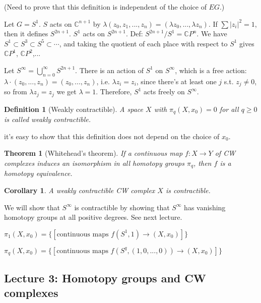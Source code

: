 \documentclass{article}
\theoremstyle{mystyle}
\newtheorem*{definition}{Definition}%
\newtheorem*{theorem*}{Theorem}
\newtheorem*{corollary*}{Corollary}
\theoremstyle{remark}
\numberwithin{equation}{section}
\begin{document}
(Need to prove that this definition is independent of the choice of $EG$.)


Let $G = S^1$. $S$ acts on $\mathbb{C}^{n+1}$ by $\lambda(z_0,z_1,...,z_n) = (\lambda z_0,...,\lambda z_n)$. If $\sum |z_i|^2=1$, then it defines $S^{2n+1}$. $S^1$ acts on $S^{2n+1}$. Def: $S^{2n+1}/S^1 = \mathbb{C}P^n$. We have $S^1\subset S^3\subset S^5\subset\cdots$, and taking the quotient of each place with respect to $S^1$ gives $\mathbb{C}P^1$, $\mathbb{C}P^2$,...

Let $S^\infty = \bigcup_{n=0}^\infty S^{2n+1}$.  There is an action of $S^1$ on $S^\infty$, which is a free action: $\lambda\cdot (z_0,...,z_n) = (z_0,...,z_n)$, i.e. $\lambda z_i = z_i$, since there's at least one $j$ s.t. $z_j\neq 0$, so from $\lambda z_j = z_j$ we get $\lambda=1$. Therefore, $S^1$ acts freely on $S^\infty$. 





\begin{definition}[Weakly contractible] A space $X$ with $\pi_q(X,x_0) = 0$ for all $q\geq 0$ is called \emph{weakly contractible}.
\end{definition}
it's easy to show that this definition does not depend on the choice of $x_0$.

\begin{theorem*}[Whitehead's theorem] If a continuous map $f\colon X\rightarrow Y$ of CW complexes induces an isomorphism in all homotopy groups $\pi_q$, then $f$ is a homotopy equivalence.
\end{theorem*}

\begin{corollary*} A weakly contractible CW complex $X$ is contractible.
\end{corollary*}

We will show that $S^\infty$ is contractible by showing that $S^\infty$ has vanishing homotopy groups at all positive degrees. See next lecture.

$\pi_1(X,x_0) = \{[\text{continuous maps } f(S^1,1)\rightarrow (X,x_0)]\}$

$\pi_q(X,x_0) = \{[\text{continuous maps } f(S^q,(1,0,...,0))\rightarrow (X,x_0)]\}$




\subsection{Lecture 3: Homotopy groups and CW complexes}
\end{document}
